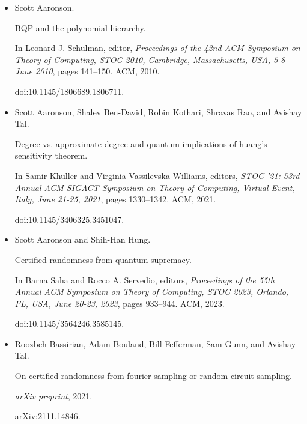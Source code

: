 \begin{itemize}


\item[] 
[1]

Scott Aaronson.


BQP and the polynomial hierarchy.


In Leonard J. Schulman, editor, \emph{Proceedings of the 42nd ACM
Symposium on Theory of Computing, STOC 2010, Cambridge, Massachusetts, USA,
5-8 June 2010}, pages 141–150. ACM, 2010.


doi:10.1145/1806689.1806711.





\item[] 
[2]

Scott Aaronson, Shalev Ben-David, Robin Kothari, Shravas Rao, and Avishay
Tal.


Degree vs. approximate degree and quantum implications of huang’s
sensitivity theorem.


In Samir Khuller and Virginia Vassilevska Williams, editors, \emph{STOC ’21: 53rd Annual ACM SIGACT Symposium on Theory of Computing,
Virtual Event, Italy, June 21-25, 2021}, pages 1330–1342. ACM, 2021.


doi:10.1145/3406325.3451047.





\item[] 
[3]

Scott Aaronson and Shih-Han Hung.


Certified randomness from quantum supremacy.


In Barna Saha and Rocco A. Servedio, editors, \emph{Proceedings of the
55th Annual ACM Symposium on Theory of Computing, STOC 2023, Orlando, FL,
USA, June 20-23, 2023}, pages 933–944. ACM, 2023.


doi:10.1145/3564246.3585145.





\item[] 
[4]

Roozbeh Bassirian, Adam Bouland, Bill Fefferman, Sam Gunn, and Avishay Tal.


On certified randomness from fourier sampling or random circuit
sampling.


\emph{arXiv preprint}, 2021.


arXiv:2111.14846.






\end{itemize}
